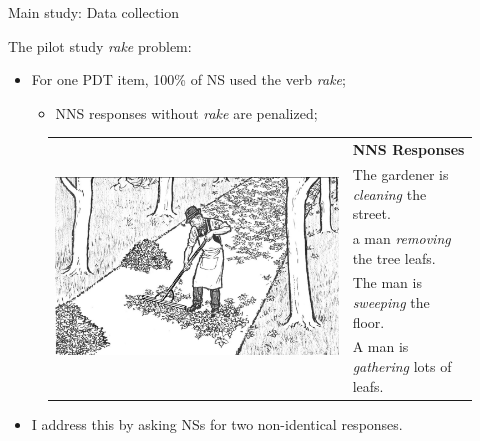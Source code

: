 \documentclass[handout,xcolor={dvipsnames}]{beamer}
\begin{document}
%


\begin{frame}{Main study: Data collection}

\vspace{1em}
The pilot study \textit{rake} problem:

\begin{itemize}
\item For one PDT item, 100\% of NS used the verb \textit{rake};
\begin{itemize}
\item NNS responses without \textit{rake} are penalized;
\end{itemize}
\end{itemize}

\vspace{-1em}
\begin{figure}[htb!]
\begin{center}
\bgroup
\def\arraystretch{1.25}
\begin{tabular}{|C{35mm}|C{65mm}|}
\hline
{} &
\textbf{NNS Responses} \\
& The gardener is \textit{cleaning} the street. \\
& a man \textit{removing} the tree leafs. \\
& The man is \textit{sweeping} the floor. \\
& A man is \textit{gathering} lots of leafs. \\
\hline
\end{tabular}
\egroup
\end{center}
\label{fig:pilot-raking}
\end{figure}

\begin{itemize}
\item I address this by asking NSs for two non-identical responses.
\end{itemize}
\end{frame}
\end{document}
